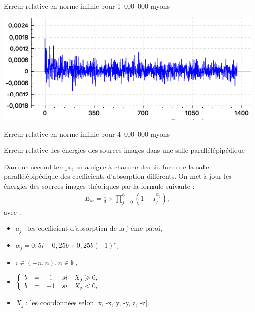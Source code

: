 \begin{figureth}
\begin{subfigureth}{0.8\textwidth}
		\caption{Erreur relative en norme infinie pour 1~000~000 rayons}
		\label{test3_3}
	\end{subfigureth}
	\begin{subfigureth}{0.8\textwidth}
		\includegraphics[width=\linewidth]{images/test3_4}
		\caption{Erreur relative en norme infinie pour 4~000~000 rayons}
		\label{test3_4}
	\end{subfigureth}
	\caption{Erreur relative des énergies des sources-images dans une salle parallélépipédique}
\end{figureth}
		
Dans un second temps, on assigne à chacune des six faces de la salle parallélépipédique des coefficients d'absorption différents. On met à jour les énergies des sources-images théoriques par la formule suivante :
\begin{align}
E_{si} = \frac{1}{d} \times \prod_{j=0}^{6}{(1-a_j^{\alpha_j})}, 
\end{align}
avec : 
\begin{itemize}
\item $a_j$ : les coefficient d'absorption de la j-ème paroi,
\item $\alpha_j  = 0,5i - 0,25b + 0,25b(-1)^i$,
\item $ i \in (-n, n), n \in \mathbb{N}$,
\item  $
 \left \{
   \begin{array}{r c c c l}
       b & = & 1 & si & X_j \geqslant 0, \\
       b & = & -1 & si & X_j < 0,
   \end{array}
   \right.$
\item $X_j$ : les coordonnées selon [x, -x, y, -y, z, -z].
\end{itemize}

